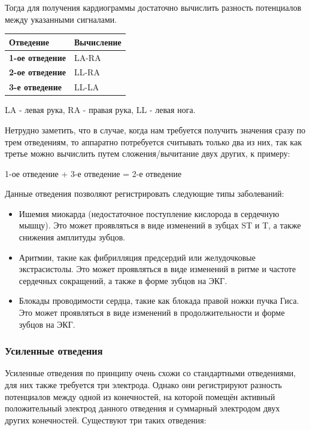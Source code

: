 \documentclass[12pt, russian]{extarticle}
\begin{document}
\begin{spacing}{1.5}
Тогда для получения кардиограммы достаточно вычислить разность потенциалов между указанными сигналами.

\begin{center}
\begin{tabular}{|l|l|}
\hline
\textbf{Отведение}      & \textbf{Вычисление} \\ \hline
\textbf{1-ое отведение} & LA-RA               \\ \hline
\textbf{2-ое отведение} & LL-RA               \\ \hline
\textbf{3-е отведение}  & LL-LA               \\ \hline
\end{tabular} \bigbreak
LA - левая рука, RA - правая рука, LL - левая нога.
\end{center}

Нетрудно заметить, что в случае, когда нам требуется получить значения сразу по трем отведениям, то аппаратно потребуется считывать только два из них, так как третье можно вычислить путем сложения/вычитание двух других, к примеру:

\begin{center}
    1-ое отведение + 3-е отведение = 2-е отведение
\end{center}

Данные отведения позволяют регистрировать следующие типы заболеваний: 

\begin{itemize}
    \item Ишемия миокарда (недостаточное поступление кислорода в сердечную мышцу). Это может проявляться в виде изменений в зубцах ST и T, а также снижения амплитуды зубцов.
    \item Аритмии, такие как фибрилляция предсердий или желудочковые экстрасистолы. Это может проявляться в виде изменений в ритме и частоте сердечных сокращений, а также в форме зубцов на ЭКГ.
    \item Блокады проводимости сердца, такие как блокада правой ножки пучка Гиса. Это может проявляться в виде изменений в продолжительности и форме зубцов на ЭКГ.
\end{itemize}

\subsubsection{Усиленные отведения}

Усиленные отведения по принципу очень схожи со стандартными отведениями, для них также требуется три электрода. Однако они регистрируют разность потенциалов между одной из конечностей, на которой помещён активный положительный электрод данного отведения и суммарный электродом двух других конечностей. Существуют три таких отведения:


\end{spacing}
\end{document}
